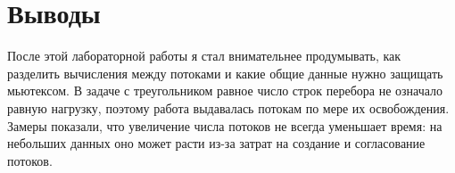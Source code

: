 \section{Выводы}
После этой лабораторной работы я стал внимательнее продумывать, как разделить вычисления между потоками и какие общие данные нужно защищать мьютексом. В задаче с треугольником равное число строк перебора не означало равную нагрузку, поэтому работа выдавалась потокам по мере их освобождения. Замеры показали, что увеличение числа потоков не всегда уменьшает время: на небольших данных оно может расти из-за затрат на создание и согласование потоков.

\pagebreak
